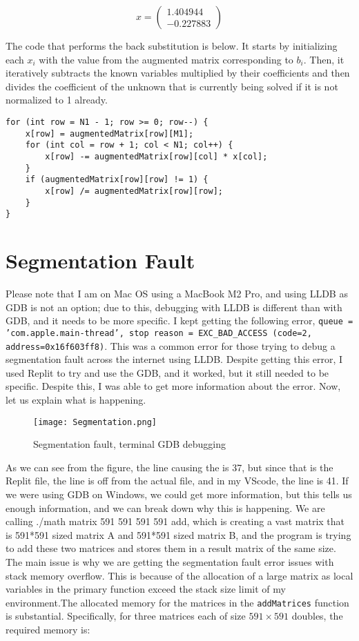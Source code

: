 \documentclass[a4paper]{article}
\begin{document}
\[
x = \begin{pmatrix}
1.404944 \\
-0.227883
\end{pmatrix}
\]

The code that performs the back substitution is below. It starts by initializing each \(x_i\) with the value from the augmented matrix corresponding to \(b_i\). Then, it iteratively subtracts the known variables multiplied by their coefficients and then divides the coefficient of the unknown that is currently being solved if it is not normalized to 1 already. 

\begin{verbatim}
for (int row = N1 - 1; row >= 0; row--) {
    x[row] = augmentedMatrix[row][M1];
    for (int col = row + 1; col < N1; col++) {
        x[row] -= augmentedMatrix[row][col] * x[col];
    }
    if (augmentedMatrix[row][row] != 1) {
        x[row] /= augmentedMatrix[row][row];
    }
}
\end{verbatim}


\section{Segmentation Fault}
Please note that I am on Mac OS using a MacBook M2 Pro, and using LLDB as GDB is not an option; due to this, debugging with LLDB is different than with GDB, and it needs to be more specific. I kept getting the following error, \texttt{queue = 'com.apple.main-thread', stop reason = EXC\_BAD\_ACCESS (code=2, address=0x16f603ff8)}. This was a common error for those trying to debug a segmentation fault across the internet using LLDB. Despite getting this error, I used Replit to try and use the GDB, and it worked, but it still needed to be specific. Despite this, I was able to get more information about the error. Now, let us explain what is happening.

\begin{figure}[ht]
\centering
\texttt{[image: Segmentation.png]}
\caption{Segmentation fault, terminal GDB debugging}
\label{fig:dog}
\end{figure}

As we can see from the figure, the line causing the is 37, but since that is the Replit file, the line is off from the actual file, and in my VScode, the line is 41. If we were using GDB on Windows, we could get more information, but this tells us enough information, and we can break down why this is happening. We are calling ./math matrix 591 591 591 591 add, which is creating a vast matrix that is 591*591 sized matrix A and 591*591  sized matrix B, and the program is trying to add these two matrices and stores them in a result matrix of the same size. The main issue is why we are getting the segmentation fault error issues with stack memory overflow. This is because of the allocation of a large matrix as local variables in the primary function exceed the stack size limit of my environment.The allocated memory for the matrices in the \texttt{addMatrices} function is substantial. Specifically, for three matrices each of size $591 \times 591$ doubles, the required memory is:
\end{document}
